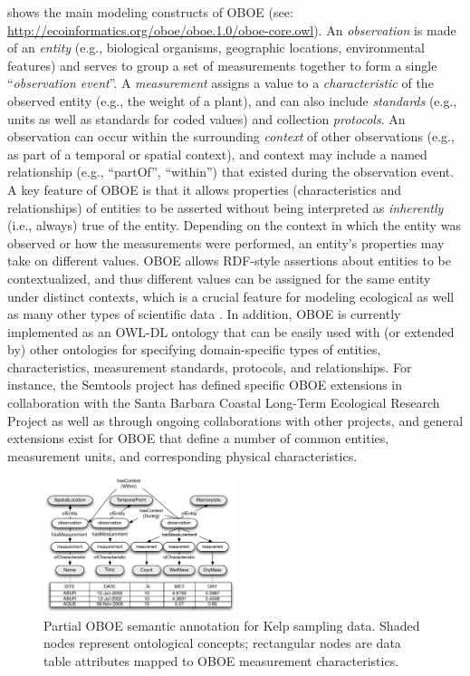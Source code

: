   shows the
main modeling constructs of OBOE (see:
\url{http://ecoinformatics.org/oboe/oboe.1.0/oboe-core.owl}). An {\em
  observation} is made of an {\em entity} (e.g., biological organisms,
geographic locations, environmental features) and serves to group a
set of measurements together to form a single ``\emph{observation
  event}''. A \emph{measurement} assigns a value to a {\em
  characteristic} of the observed entity (e.g., the weight of a
plant), and can also include \emph{standards} (e.g., units as well as
standards for coded values) and collection \emph{protocols}. An
observation can occur within the surrounding \emph{context} of other
observations (e.g., as part of a temporal or spatial context), and
context may include a named relationship (e.g., ``partOf'',
``within'') that existed during the observation event. A key feature
of OBOE is that it allows properties (characteristics and
relationships) of entities to be asserted without being interpreted as
\emph{inherently} (i.e., {always}) true of the entity.  Depending on
the context in which the entity was observed or how the measurements
were performed, an entity's properties may take on different values.
OBOE allows RDF-style assertions about entities to be contextualized,
and thus different values can be assigned for the same entity under
distinct contexts, which is a crucial feature for modeling ecological
as well as many other types of scientific data
\cite{bowers08,mungall07:_repres_phenot_in_owl}. In addition, OBOE is
currently implemented as an OWL-DL ontology that can be easily used
with (or extended by) other ontologies for specifying domain-specific
types of entities, characteristics, measurement standards, protocols,
and relationships. For instance, the Semtools project has defined
specific OBOE extensions in collaboration with the Santa Barbara
Coastal Long-Term Ecological Research Project as well as through
ongoing collaborations with other projects, and general extensions
exist for OBOE that define a number of common entities, measurement
units, and corresponding physical characteristics.

\begin{figure}[!b]
\centering
\includegraphics[width=0.5\textwidth]{images/kelp-mass-model.pdf}
\caption{Partial OBOE semantic annotation for Kelp sampling
  data. Shaded nodes represent ontological concepts; rectangular nodes
  are data table attributes mapped to OBOE measurement
  characteristics.}
\label{fig:kelp-mass-model}
\end{figure}

